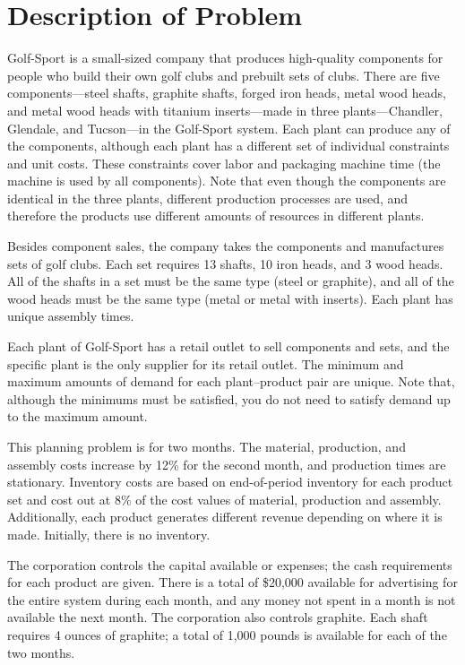 \documentclass{article}
\begin{document}
\section{Description of Problem}
Golf-Sport is a small-sized company that produces high-quality components for people who build their own golf clubs and prebuilt sets of clubs. There are five components—steel shafts, graphite shafts, forged iron heads, metal wood heads, and metal wood heads with titanium inserts—made in three plants—Chandler, Glendale, and Tucson—in the Golf-Sport system. Each plant can produce any of the components, although each plant has a different set of individual constraints and unit costs. These constraints cover labor and packaging machine time (the machine is used by all components). Note that even though the components are identical in the three plants, different production processes are used, and therefore the products use different amounts of resources in different plants.
\par
Besides component sales, the company takes the components and manufactures sets of golf clubs. Each set requires 13 shafts, 10 iron heads, and 3 wood heads. All of the shafts in a set must be the same type (steel or graphite), and all of the wood heads must be the same type (metal or metal with inserts). Each plant has unique assembly times.
\par
Each plant of Golf-Sport has a retail outlet to sell components and sets, and the specific plant is the only supplier for its retail outlet. The minimum and maximum amounts of demand for each plant–product pair are unique. Note that, although the minimums must be satisfied, you do not need to satisfy demand up to the maximum amount.
\par
This planning problem is for two months. The material, production, and assembly costs increase by 12\% for the second month, and production times are stationary. Inventory costs are based on end-of-period inventory for each product set and cost out at 8\% of the cost values of material, production and assembly. Additionally, each product generates different revenue depending on where it is made. Initially, there is no inventory.
\par
The corporation controls the capital available or expenses; the cash requirements for each product are given. There is a total of \$20,000 available for advertising for the entire system during each month, and any money not spent in a month is not available the next month. The corporation also controls graphite. Each shaft requires 4 ounces of graphite; a total of 1,000 pounds is available for each of the two months. 
\end{document}
